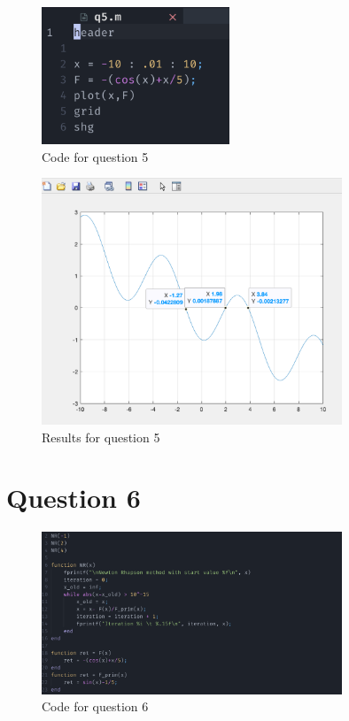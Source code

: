 \documentclass{article}
\begin{document}
\begin{figure}[H]
	\centering
	\includegraphics[width=0.5\textwidth]{imgs/q5_code.png}
	\caption{Code for question 5}
	\label{fig:q5_code}
\end{figure}

\begin{figure}[H]
	\centering
	\includegraphics[width=0.8\textwidth]{imgs/q5_results.png}
	\caption{Results for question 5}
	\label{fig:q5_result}
\end{figure}

\newpage
\section{Question 6}
\begin{figure}[H]
	\centering
	\includegraphics[width=0.8\textwidth]{imgs/q6_code.png}
	\caption{Code for question 6}
	\label{fig:q6_code}
\end{figure}
\end{document}
